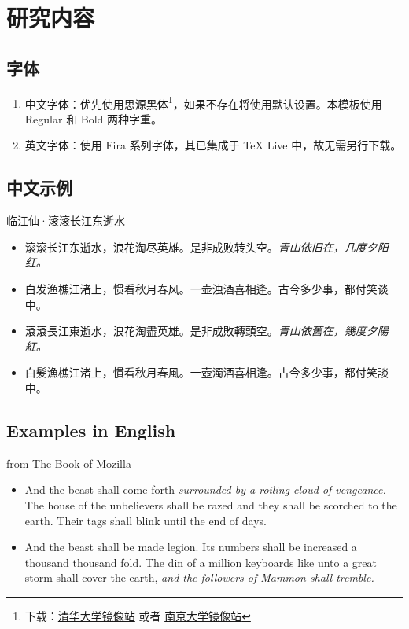 \documentclass[no-math]{ctexbeamer}
\begin{document}
\section{研究内容}

\subsection{字体}
\begin{frame}
	\begin{enumerate}
		\item 中文字体：优先使用思源黑体\footnote{下载：\href{https://mirrors.tuna.tsinghua.edu.cn/adobe-fonts/source-han-sans/OTF/SimplifiedChinese/}{清华大学镜像站} 或者 \href{https://mirror.nju.edu.cn/adobe-fonts/source-han-sans/OTF/SimplifiedChinese/}{南京大学镜像站}}，如果不存在将使用默认设置。本模板使用 Regular 和 Bold 两种字重。
		\item 英文字体：使用 Fira 系列字体，其已集成于 TeX Live 中，故无需另行下载。
	\end{enumerate}
\end{frame}

\subsection{中文示例}

\begin{frame}{临江仙·滚滚长江东逝水}
	\begin{itemize}
		\item 滚滚长江东逝水，浪花淘尽英雄。是非成败转头空。\emph{青山依旧在，几度夕阳红。}
		\item 白发渔樵江渚上，惯看秋月春风。一壶浊酒喜相逢。古今多少事，都付笑谈中。
		\item 滾滾長江東逝水，浪花淘盡英雄。是非成敗轉頭空。\emph{青山依舊在，幾度夕陽紅。}
		\item 白髮漁樵江渚上，慣看秋月春風。一壺濁酒喜相逢。古今多少事，都付笑談中。
	\end{itemize}
\end{frame}

\subsection{Examples in English}

\begin{frame}{from The Book of Mozilla}
	\begin{itemize}
		\item And the beast shall come forth \emph{surrounded by a roiling cloud of vengeance.} The house of the unbelievers shall be razed and they shall be scorched to the earth. Their tags shall blink until the end of days.
		\item And the beast shall be made legion. Its numbers shall be increased a thousand thousand fold. The din of a million keyboards like unto a great storm shall cover the earth, \textit{and the followers of Mammon shall tremble.}
	\end{itemize}
\end{frame}
\end{document}
